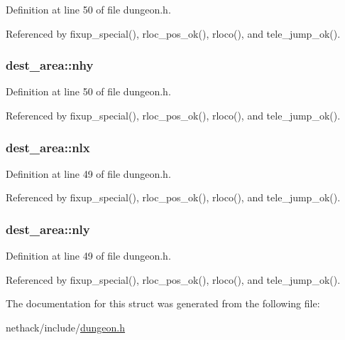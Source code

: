 Definition at line 50 of file dungeon.\+h.



Referenced by fixup\+\_\+special(), rloc\+\_\+pos\+\_\+ok(), rloco(), and tele\+\_\+jump\+\_\+ok().

\hypertarget{structdest__area_acf56be5da5eddccf745d70f6b7b8922b}{
\subsubsection[{nhy}]{ dest\+\_\+area\+::nhy}}\label{structdest__area_acf56be5da5eddccf745d70f6b7b8922b}


Definition at line 50 of file dungeon.\+h.



Referenced by fixup\+\_\+special(), rloc\+\_\+pos\+\_\+ok(), rloco(), and tele\+\_\+jump\+\_\+ok().

\hypertarget{structdest__area_a3841cd1351a730acf221e7b4bf12a198}{
\subsubsection[{nlx}]{ dest\+\_\+area\+::nlx}}\label{structdest__area_a3841cd1351a730acf221e7b4bf12a198}


Definition at line 49 of file dungeon.\+h.



Referenced by fixup\+\_\+special(), rloc\+\_\+pos\+\_\+ok(), rloco(), and tele\+\_\+jump\+\_\+ok().

\hypertarget{structdest__area_a1c6b08cac0b134b417e8ef813e2816be}{
\subsubsection[{nly}]{ dest\+\_\+area\+::nly}}\label{structdest__area_a1c6b08cac0b134b417e8ef813e2816be}


Definition at line 49 of file dungeon.\+h.



Referenced by fixup\+\_\+special(), rloc\+\_\+pos\+\_\+ok(), rloco(), and tele\+\_\+jump\+\_\+ok().



The documentation for this struct was generated from the following file\+:\begin{DoxyCompactItemize}
\item 
nethack/include/\hyperlink{dungeon_8h}{dungeon.\+h}\end{DoxyCompactItemize}
